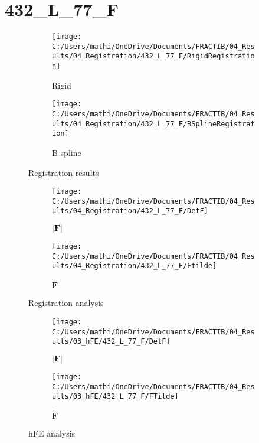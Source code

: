 \documentclass{article}%
\begin{document}
%
\normalsize%
\section*{432\_L\_77\_F}%
\label{sec:432L77F}%


\begin{figure}[h!]%
\begin{subfigure}[b]{0.5\linewidth}%
\texttt{[image: C:/Users/mathi/OneDrive/Documents/FRACTIB/04\_Results/04\_Registration/432\_L\_77\_F/RigidRegistration]}%
\caption{Rigid}%
\end{subfigure}%
\begin{subfigure}[b]{0.5\linewidth}%
\texttt{[image: C:/Users/mathi/OneDrive/Documents/FRACTIB/04\_Results/04\_Registration/432\_L\_77\_F/BSplineRegistration]}%
\caption{B{-}spline}%
\end{subfigure}%
\caption{Registration results}%
\end{figure}

%


\begin{figure}[h!]%
\begin{subfigure}[b]{0.5\linewidth}%
\texttt{[image: C:/Users/mathi/OneDrive/Documents/FRACTIB/04\_Results/04\_Registration/432\_L\_77\_F/DetF]}%
\caption{$|\mathbf{F}|$}%
\end{subfigure}%
\begin{subfigure}[b]{0.5\linewidth}%
\texttt{[image: C:/Users/mathi/OneDrive/Documents/FRACTIB/04\_Results/04\_Registration/432\_L\_77\_F/Ftilde]}%
\caption{$\tilde{\mathbf{F}}$}%
\end{subfigure}%
\caption{Registration analysis}%
\end{figure}

%


\begin{figure}[h!]%
\begin{subfigure}[b]{0.5\linewidth}%
\texttt{[image: C:/Users/mathi/OneDrive/Documents/FRACTIB/04\_Results/03\_hFE/432\_L\_77\_F/DetF]}%
\caption{$|\mathbf{F}|$}%
\end{subfigure}%
\begin{subfigure}[b]{0.5\linewidth}%
\texttt{[image: C:/Users/mathi/OneDrive/Documents/FRACTIB/04\_Results/03\_hFE/432\_L\_77\_F/FTilde]}%
\caption{$\tilde{\mathbf{F}}$}%
\end{subfigure}%
\caption{hFE analysis}%
\end{figure}
\end{document}
